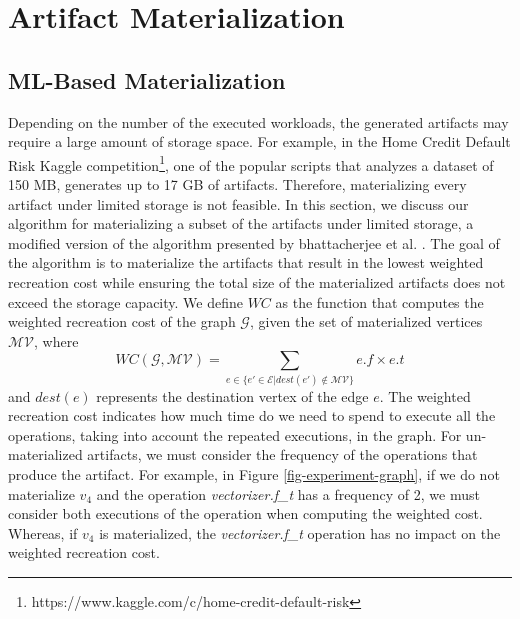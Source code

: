 \section{Artifact Materialization}\label{sec-materialization}
\subsection{ML-Based Materialization}
Depending on the number of the executed workloads, the generated artifacts may require a large amount of storage space.
For example, in the Home Credit Default Risk Kaggle competition\footnote{https://www.kaggle.com/c/home-credit-default-risk}, one of the popular scripts that analyzes a dataset of 150 MB, generates up to 17 GB of artifacts.
Therefore, materializing every artifact under limited storage is not feasible.
In this section, we discuss our algorithm for materializing a subset of the artifacts under limited storage, a modified version of the algorithm presented by bhattacherjee et al. \cite{bhattacherjee2015principles}.
The goal of the algorithm is to materialize the artifacts that result in the lowest weighted recreation cost while ensuring the total size of the materialized artifacts does not exceed the storage capacity.
We define $WC$ as the function that computes the weighted recreation cost of the graph $\mathcal{G}$, given the set of materialized vertices $\mathcal{MV}$, where  
\[
WC(\mathcal{G}, \mathcal{MV}) =  \sum\limits_{e \in \{e' \in \mathcal{E}  \lvert dest(e') \notin \mathcal{MV}\}}  e.f \times e.t
\]
and $dest(e)$ represents the destination vertex of the edge $e$.
The weighted recreation cost indicates how much time do we need to spend to execute all the operations, taking into account the repeated executions, in the graph.
For un-materialized artifacts, we must consider the frequency of the operations that produce the artifact.
For example, in Figure \ref{fig-experiment-graph}, if we do not materialize $v_4$ and the operation \textit{vectorizer.f\_t} has a frequency of 2, we must consider both executions of the operation when computing the weighted cost.
Whereas, if $v_4$ is materialized, the \textit{vectorizer.f\_t} operation has no impact on the weighted recreation cost.

